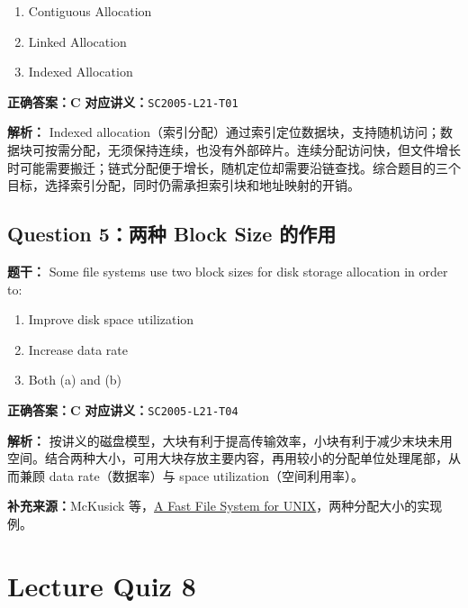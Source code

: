 \documentclass[11pt,a4paper,fontset=fandol]{ctexart}
\renewcommand{\exercisequestion}[2]{%
  \Needspace{5\baselineskip}%
  \subsection{#2}\label{exercise:#1}%
}
\renewenvironment{checkedsolution}
  {\par\nopagebreak[4]\textbf{解析：}\ignorespaces}
  {\par}
\begin{document}
\begin{enumerate}[label=\Alph*.,leftmargin=2.4em]
  \item Contiguous Allocation
  \item Linked Allocation
  \item Indexed Allocation
\end{enumerate}

\textbf{正确答案：C}\qquad
\textbf{对应讲义：}\texttt{SC2005-L21-T01}

\begin{checkedsolution}
Indexed allocation（索引分配）通过索引定位数据块，支持随机访问；数据块可按需分配，无须保持连续，也没有外部碎片。连续分配访问快，但文件增长时可能需要搬迁；链式分配便于增长，随机定位却需要沿链查找。综合题目的三个目标，选择索引分配，同时仍需承担索引块和地址映射的开销。
\end{checkedsolution}

\exercisequestion{SC2005-HW07-Q05}{Question 5：两种 Block Size 的作用}

\textbf{题干：} Some file systems use two block sizes for disk storage allocation in order to:

\begin{enumerate}[label=\Alph*.,leftmargin=2.4em]
  \item Improve disk space utilization
  \item Increase data rate
  \item Both (a) and (b)
\end{enumerate}

\textbf{正确答案：C}\qquad
\textbf{对应讲义：}\texttt{SC2005-L21-T04}

\begin{checkedsolution}
按讲义的磁盘模型，大块有利于提高传输效率，小块有利于减少末块未用空间。结合两种大小，可用大块存放主要内容，再用较小的分配单位处理尾部，从而兼顾 data rate（数据率）与 space utilization（空间利用率）。

{\small\textbf{补充来源：}McKusick 等，\href{https://www.cs.columbia.edu/~junfeng/11sp-w4118/lectures/ffs.pdf}{A Fast File System for UNIX}，两种分配大小的实现例。}
\end{checkedsolution}

\section{Lecture Quiz 8}
\label{homework:SC2005-HW08}
\end{document}
